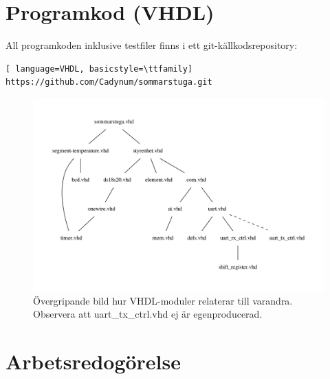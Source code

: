 \documentclass[a4paper]{scrartcl}
\begin{document}
\clearpage
\section{Programkod (VHDL)}
All programkoden inklusive testfiler finns i ett git-källkodsrepository:
\begin{lstlisting}[	language=VHDL, basicstyle=\ttfamily]
https://github.com/Cadynum/sommarstuga.git
\end{lstlisting}

\begin{figure}[htp]
\centering
\includegraphics[width=\textwidth]{filstruktur.pdf}
\caption{Övergripande bild hur VHDL-moduler relaterar till varandra. Observera att uart\_tx\_ctrl.vhd ej är egenproducerad.}
\end{figure}




\clearpage
\section{Arbetsredogörelse}
\end{document}
